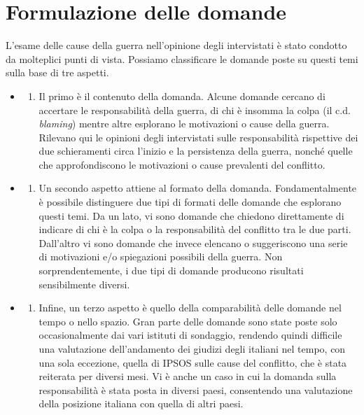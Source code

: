 \documentclass[
]{book}
\providecommand{\tightlist}{%
  \setlength{\itemsep}{0pt}\setlength{\parskip}{0pt}}
\begin{document}
\hypertarget{formulazione-delle-domande-1}{%
\section{Formulazione delle domande}\label{formulazione-delle-domande-1}}

L'esame delle cause della guerra nell'opinione degli intervistati è stato condotto da molteplici punti di vista. Possiamo classificare le domande poste su questi temi sulla base di tre aspetti.

\begin{itemize}
\item
  \begin{enumerate}
  \def\labelenumi{\alph{enumi})}
  \tightlist
  \item
    Il primo è il contenuto della domanda. Alcune domande cercano di accertare le responsabilità della guerra, di chi è insomma la colpa (il c.d. \emph{blaming}) mentre altre esplorano le motivazioni o cause della guerra. Rilevano qui le opinioni degli intervistati sulle responsabilità rispettive dei due schieramenti circa l'inizio e la persistenza della guerra, nonché quelle che approfondiscono le motivazioni o cause prevalenti del conflitto.
  \end{enumerate}
\item
  \begin{enumerate}
  \def\labelenumi{\alph{enumi})}
  \setcounter{enumi}{1}
  \tightlist
  \item
    Un secondo aspetto attiene al formato della domanda. Fondamentalmente è possibile distinguere due tipi di formati delle domande che esplorano questi temi. Da un lato, vi sono domande che chiedono direttamente di indicare di chi è la colpa o la responsabilità del conflitto tra le due parti. Dall'altro vi sono domande che invece elencano o suggeriscono una serie di motivazioni e/o spiegazioni possibili della guerra. Non sorprendentemente, i due tipi di domande producono risultati sensibilmente diversi.
  \end{enumerate}
\item
  \begin{enumerate}
  \def\labelenumi{\alph{enumi})}
  \setcounter{enumi}{2}
  \tightlist
  \item
    Infine, un terzo aspetto è quello della comparabilità delle domande nel tempo o nello spazio. Gran parte delle domande sono state poste solo occasionalmente dai vari istituti di sondaggio, rendendo quindi difficile una valutazione dell'andamento dei giudizi degli italiani nel tempo, con una sola eccezione, quella di IPSOS sulle cause del conflitto, che è stata reiterata per diversi mesi. Vi è anche un caso in cui la domanda sulla responsabilità è stata posta in diversi paesi, consentendo una valutazione della posizione italiana con quella di altri paesi.
  \end{enumerate}
\end{itemize}
\end{document}
